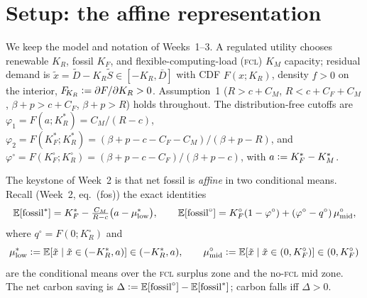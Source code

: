 \documentclass[11pt,reqno]{amsart}
\theoremstyle{plain}
\theoremstyle{definition}
\theoremstyle{remark}
\theoremstyle{remark}\newtheorem{observation}{Observation}
\newcommand{\KR}{K_R}\newcommand{\KF}{K_F}\newcommand{\KM}{K_M}
\newcommand{\KRs}{K_R^{*}}\newcommand{\KFs}{K_F^{*}}\newcommand{\KMs}{K_M^{*}}
\newcommand{\KRo}{K_R^{\circ}}\newcommand{\KFo}{K_F^{\circ}}
\newcommand{\Dbar}{\bar D}\newcommand{\CM}{C_M}\newcommand{\CF}{C_F}\newcommand{\CR}{C_R}
\newcommand{\bp}{\beta+p}\newcommand{\FKR}{F_{\!\KR}}
\newcommand{\E}{\mathbb{E}}\newcommand{\PP}{\mathbb{P}}\newcommand{\eqdef}{\vcentcolon=}
\newcommand{\mustar}{\mu^{*}_{\mathrm{low}}}\newcommand{\mumid}{\mu^{\circ}_{\mathrm{mid}}}
\newcommand{\phio}{\varphi^{\circ}}\newcommand{\qo}{q^{\circ}}
\begin{document}
\begin{abstract}
and the carbon-down set an interval under a monotonicity Condition~S---is
\textbf{withdrawn} (Remark~\ref{rem:phaseretracted}): every cell in which the supporting
sweep reported $\Phi>0$ lies in the small-\textsc{fcl} regime where \eqref{eq:Phi} is not
the correct identity, and the true $\Delta$ is negative in all of them. Consequently the
``only if'' branch is not merely untested: we searched $(\CR,\CM,R)$ and found no
decarbonizing equilibrium, with $\Delta$ bounded away from zero ($\le-1.21$) on the
large-\textsc{fcl} regime where $\Phi$ is valid (Remark~\ref{rem:emptybranch}). Verification in \texttt{verify\_week4.py}
now carries a regime guard and raises rather than returning a wrong-signed $\Phi$.
\end{abstract}

\maketitle

\section{Setup: the affine representation}\label{sec:setup}

We keep the model and notation of Weeks~1--3. A regulated utility chooses renewable
$\KR$, fossil $\KF$, and flexible-computing-load (\textsc{fcl}) $\KM$ capacity; residual
demand is $\tilde x=\tilde D-\KR\tilde S\in[-\KR,\Dbar]$ with CDF $F(x;\KR)$, density
$f>0$ on the interior, $\FKR\eqdef\partial F/\partial\KR>0$. Assumption~1
($R>c+\CM$, $R<c+\CF+\CM$, $\bp>c+\CF$, $\bp>R$) holds throughout. The
distribution-free cutoffs are
$\varphi_1=F(a;\KRs)=\CM/(R-c)$, $\varphi_2=F(\KFs;\KRs)=(\bp-c-\CF-\CM)/(\bp-R)$, and
$\phio=F(\KFo;\KRo)=(\bp-c-\CF)/(\bp-c)$, with $a\eqdef\KFs-\KMs$.

The keystone of Week~2 is that net fossil is \emph{affine} in two conditional means.
Recall (Week~2, eq.~(fos)) the exact identities
\begin{equation}\label{eq:fos}
  \E[\fossil^{*}]=\KFs-\tfrac{\CM}{R-c}\big(a-\mustar\big),\qquad
  \E[\fossil^{\circ}]=\KFo(1-\phio)+(\phio-\qo)\,\mumid,
\end{equation}
where $\qo=F(0;\KRo)$ and
\begin{equation}\label{eq:means}
  \mustar\eqdef\E[\tilde x\mid\tilde x\in(-\KRs,a)]\in(-\KRs,a),\qquad
  \mumid\eqdef\E[\tilde x\mid\tilde x\in(0,\KFo)]\in(0,\KFo)
\end{equation}
are the conditional means over the \textsc{fcl} surplus zone and the no-\textsc{fcl}
mid zone. The net carbon saving is $\Delta\eqdef\E[\fossil^{\circ}]-\E[\fossil^{*}]$;
carbon falls iff $\Delta>0$.
\end{document}
